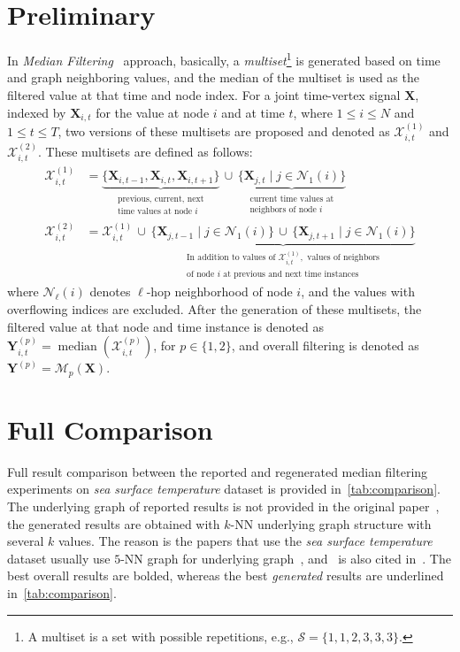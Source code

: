 \documentclass[a4paper,10pt,conference,onecolumn]{IEEEtran}
\begin{document}
\begin{multicols}{2}
	\section{Preliminary}
	In \textit{Median Filtering}~\cite{median} approach, basically, a \textit{multiset}\footnote{A multiset is a set with possible repetitions, e.g., \(\mathcal{S}=\{1,1,2,3,3,3\} \).} is generated based on time and graph neighboring values, and the median of the multiset is used as the filtered value at that time and node index. For a joint time-vertex signal $\mathbf{X}$, indexed by $\mathbf{X}_{i,t}$ for the value at node $i$ and at time $t$, where $1\leq i \leq N$ and $1\leq t \leq T$, two versions of these multisets are proposed and denoted as $\mathcal{X}_{i,t}^{(1)}$ and $\mathcal{X}_{i,t}^{(2)}$. These multisets are defined as follows:
	\begin{align}
		\mathcal{X}_{i,t}^{(1)} & = \underbrace{\{\mathbf{X}_{i,t-1},\mathbf{X}_{i,t},\mathbf{X}_{i,t+1}\}}_{\substack{\text{previous, current, next}                                                                                                                                          \\\text{time values at node } i}}\,\cup \, \underbrace{\{\mathbf{X}_{j,t}\mid j\in\mathcal{N}_{1}(i)\}}_{\substack{\text{current time values at}\\ \text{neighbors of node } i}} \\
		\mathcal{X}_{i,t}^{(2)} & = \mathcal{X}_{i,t}^{(1)}\,\cup \,\underbrace{\{\mathbf{X}_{j,t-1}\mid j\in\mathcal{N}_{1}(i)\} \,\cup \, \{\mathbf{X}_{j,t+1}\mid j\in\mathcal{N}_{1}(i)\}}_{\substack{\text{In addition to values of }\mathcal{X}_{i,t}^{(1)}, \text{ values of neighbors} \\ \text{of node } i \text{ at previous and next time instances}}}
	\end{align}
	where \(\mathcal{N}_\ell(i)\) denotes \(\ell \)-hop neighborhood of node \(i\), and the values with overflowing indices are excluded. After the generation of these multisets, the filtered value at that node and time instance is denoted as $\mathbf{Y}_{i,t}^{(p)}=\operatorname{median}(\mathcal{X}_{i,t}^{(p)})$, for $p\in \{ 1,2\} $, and overall filtering is denoted as $\mathbf{Y}^{(p)} = \mathcal{M}_{p}(\mathbf{X})$.

	\section{Full Comparison}
	Full result comparison between the reported and regenerated median filtering experiments on \textit{sea surface temperature} dataset is provided in~\cref{tab:comparison}. The underlying graph of reported results is not provided in the original paper~\cite{median}, the generated results are obtained with \(k\)-NN underlying graph structure with several \(k\) values. The reason is the papers that use the \textit{sea surface temperature} dataset usually use \(5\)-NN graph for underlying graph~\cite{reconstruction,sobolev}, and~\cite{reconstruction} is also cited in~\cite{median}. The best overall results are bolded, whereas the best \textit{generated} results are underlined in~\cref{tab:comparison}.


\end{multicols}
\end{document}
